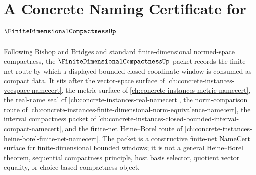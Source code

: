 \chapter{A Concrete Naming Certificate for $\FiniteDimensionalCompactnessUp$}
\label{ch:concrete-instances-finite-dimensional-compactness-namecert}

Following Bishop and Bridges and standard finite-dimensional normed-space compactness, the $\FiniteDimensionalCompactnessUp$ packet records the finite-net route by which a displayed bounded closed coordinate window is consumed as compact data. It sits after the vector-space surface of \autoref{ch:concrete-instances-vecspace-namecert}, the metric surface of \autoref{ch:concrete-instances-metric-namecert}, the real-name seal of \autoref{ch:concrete-instances-real-namecert}, the norm-comparison route of \autoref{ch:concrete-instances-finite-dimensional-norm-equivalence-namecert}, the interval compactness packet of \autoref{ch:concrete-instances-closed-bounded-interval-compact-namecert}, and the finite-net Heine--Borel route of \autoref{ch:concrete-instances-heine-borel-finite-net-namecert}. The packet is a constructive finite-net NameCert surface for finite-dimensional bounded windows; it is not a general Heine--Borel theorem, sequential compactness principle, host basis selector, quotient vector equality, or choice-based compactness object.

